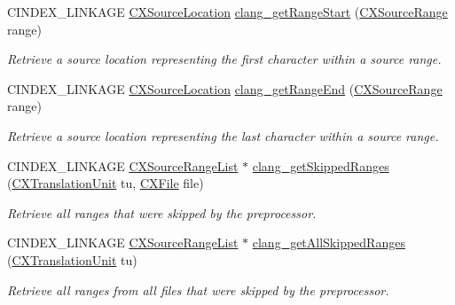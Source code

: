 \begin{DoxyCompactItemize}
\mbox{\label{group__CINDEX__LOCATIONS_gac2cc034e3965739c41662f6ada7ff248}} 
C\+I\+N\+D\+E\+X\+\_\+\+L\+I\+N\+K\+A\+GE \mbox{\hyperlink{structCXSourceLocation}{C\+X\+Source\+Location}} \mbox{\hyperlink{group__CINDEX__LOCATIONS_gac2cc034e3965739c41662f6ada7ff248}{clang\+\_\+get\+Range\+Start}} (\mbox{\hyperlink{structCXSourceRange}{C\+X\+Source\+Range}} range)
\begin{DoxyCompactList}\small\item\em Retrieve a source location representing the first character within a source range. \end{DoxyCompactList}\item 
\mbox{\label{group__CINDEX__LOCATIONS_gacdb7d3c2b77a06bcc2e83bde3e14c3c0}} 
C\+I\+N\+D\+E\+X\+\_\+\+L\+I\+N\+K\+A\+GE \mbox{\hyperlink{structCXSourceLocation}{C\+X\+Source\+Location}} \mbox{\hyperlink{group__CINDEX__LOCATIONS_gacdb7d3c2b77a06bcc2e83bde3e14c3c0}{clang\+\_\+get\+Range\+End}} (\mbox{\hyperlink{structCXSourceRange}{C\+X\+Source\+Range}} range)
\begin{DoxyCompactList}\small\item\em Retrieve a source location representing the last character within a source range. \end{DoxyCompactList}\item 
C\+I\+N\+D\+E\+X\+\_\+\+L\+I\+N\+K\+A\+GE \mbox{\hyperlink{structCXSourceRangeList}{C\+X\+Source\+Range\+List}} $\ast$ \mbox{\hyperlink{group__CINDEX__LOCATIONS_gae27bc89151459aeb94e0fb7aa0552d35}{clang\+\_\+get\+Skipped\+Ranges}} (\mbox{\hyperlink{group__CINDEX_gacdb7815736ca709ce9a5e1ec2b7e16ac}{C\+X\+Translation\+Unit}} tu, \mbox{\hyperlink{group__CINDEX__FILES_gacfcea9c1239c916597e2e5b3e109215a}{C\+X\+File}} file)
\begin{DoxyCompactList}\small\item\em Retrieve all ranges that were skipped by the preprocessor. \end{DoxyCompactList}\item 
C\+I\+N\+D\+E\+X\+\_\+\+L\+I\+N\+K\+A\+GE \mbox{\hyperlink{structCXSourceRangeList}{C\+X\+Source\+Range\+List}} $\ast$ \mbox{\hyperlink{group__CINDEX__LOCATIONS_ga06a114b020fda470476ff5293a66e5e1}{clang\+\_\+get\+All\+Skipped\+Ranges}} (\mbox{\hyperlink{group__CINDEX_gacdb7815736ca709ce9a5e1ec2b7e16ac}{C\+X\+Translation\+Unit}} tu)
\begin{DoxyCompactList}\small\item\em Retrieve all ranges from all files that were skipped by the preprocessor. \end{DoxyCompactList}\item 

\end{DoxyCompactItemize}
